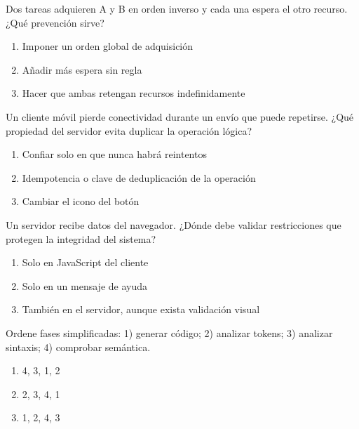 \noindent\begin{minipage}{\linewidth}\setlength{\parskip}{4pt}\label{q:S-047}
Dos tareas adquieren A y B en orden inverso y cada una espera el otro recurso. ¿Qué prevención sirve?
\begin{enumerate}[label=\Alph*),nosep]
\item Imponer un orden global de adquisición
\item Añadir más espera sin regla
\item Hacer que ambas retengan recursos indefinidamente
\end{enumerate}\end{minipage}\par\medskip

\noindent\begin{minipage}{\linewidth}\setlength{\parskip}{4pt}\label{q:S-048}
Un cliente móvil pierde conectividad durante un envío que puede repetirse. ¿Qué propiedad del servidor evita duplicar la operación lógica?
\begin{enumerate}[label=\Alph*),nosep]
\item Confiar solo en que nunca habrá reintentos
\item Idempotencia o clave de deduplicación de la operación
\item Cambiar el icono del botón
\end{enumerate}\end{minipage}\par\medskip

\noindent\begin{minipage}{\linewidth}\setlength{\parskip}{4pt}\label{q:S-049}
Un servidor recibe datos del navegador. ¿Dónde debe validar restricciones que protegen la integridad del sistema?
\begin{enumerate}[label=\Alph*),nosep]
\item Solo en JavaScript del cliente
\item Solo en un mensaje de ayuda
\item También en el servidor, aunque exista validación visual
\end{enumerate}\end{minipage}\par\medskip

\noindent\begin{minipage}{\linewidth}\setlength{\parskip}{4pt}\label{q:S-050}
Ordene fases simplificadas: 1) generar código; 2) analizar tokens; 3) analizar sintaxis; 4) comprobar semántica.
\begin{enumerate}[label=\Alph*),nosep]
\item 4, 3, 1, 2
\item 2, 3, 4, 1
\item 1, 2, 4, 3
\end{enumerate}\end{minipage}\par\medskip

